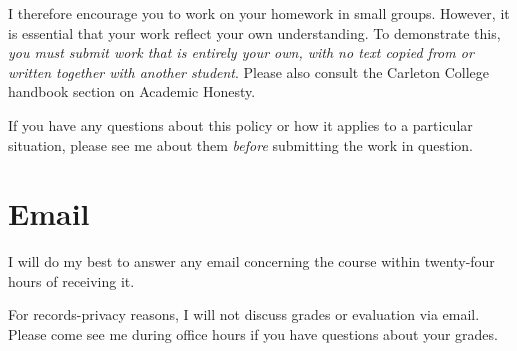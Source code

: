 \documentclass[11pt,article]{memoir}
\begin{document}
I therefore encourage you to work on your homework in small groups.
However, it is essential that your work reflect your own understanding.
To demonstrate this, \emph{you must submit work that is entirely your own, with no text copied from or written together with another student}.
Please also consult the Carleton College handbook section on Academic Honesty.

If you have any questions about this policy or how it applies to a particular situation, please see me about them \emph{before} submitting the work in question.

\section*{Email}
I will do my best to answer any email concerning the course within twenty-four hours of receiving it.

For records-privacy reasons, I will not discuss grades or evaluation via email.
Please come see me during office hours if you have questions about your grades.
\end{document}
